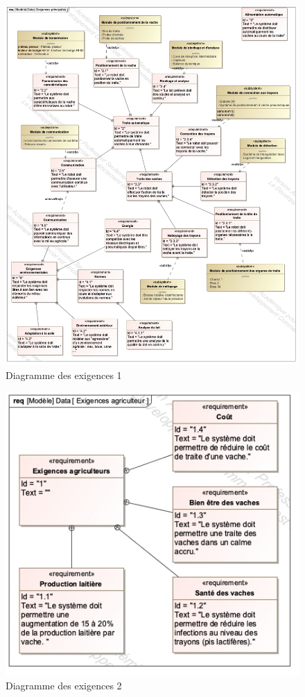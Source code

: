 \begin{figure}[ht!]
\begin{center}
 \includegraphics[width=0.9\linewidth]{img/fig010}
\end{center}
\label{fig010}
\caption{Diagramme des exigences 1}
\end{figure}

\newpage

\begin{figure}[ht!]
\begin{center}
 \includegraphics[width=0.6\linewidth]{img/fig011}
\end{center}
\label{fig011}
\caption{Diagramme des exigences 2}
\end{figure}

